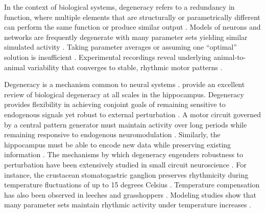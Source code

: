 \documentclass[a4paper,10pt]{article} %
\begin{document}
In the context of biological systems, degeneracy refers to a redundancy in function,
where multiple elements that are structurally or parametrically different can perform the same function
or produce similar output \parencite{edelmanDegeneracyComplexityBiological2001a, tononiMeasuresDegeneracyRedundancy1999}.
Models of neurons and networks are frequently degenerate with many parameter sets yielding similar simulated activity
\parencite{prinzAlternativeHandtuningConductancebased2003, prinzSimilarNetworkActivity2004, achardComplexParameterLandscape2006}.
Taking parameter averages or assuming one ``optimal'' solution is insufficient
\parencite{loebOptimalIsnGood2012, golowaschFailureAveragingConstruction2002}.
Experimental recordings reveal underlying animal-to-animal variability
that converges to stable, rhythmic motor patterns
\parencite{bucherAnimaltoanimalVariabilityMotor2005, hamoodAnimaltoanimalVariabilityNeuromodulation2014,
roffmanAnimaltoanimalVariabilityConnection2012, marderVariabilityCompensationModulation2011}.

Degeneracy is a mechanism common to neural systems
\parencite{whitacreDegeneracyDesignPrinciple2010, stellingRobustnessCellularFunctions2004,
goldmanGlobalStructureRobustness2001, tononiMeasuresDegeneracyRedundancy1999}.
\cite{rathourDegeneracyHippocampalPhysiology2019} provide an excellent review
of biological degeneracy at all scales in the hippocampus.
Degeneracy provides flexibility in achieving conjoint goals of remaining sensitive
to endogenous signals yet robust to external perturbation
\parencite{marderNeuromodulationCircuitsVariable2014, olearyCorrelationsIonChannel2013}.
A motor circuit governed by a central pattern generator must maintain activity
over long periods while remaining responsive to endogenous neuromodulation
\parencite{marderHowCanMotor2015}.
Similarly, the hippocampus must be able to encode new data while preserving existing information
\parencite{mauSameHippocampalCA12018, piatkevichPopulationImagingNeural2019}.
The mechanisms by which degeneracy engenders robustness to perturbation
have been extensively studied in small circuit neuroscience
\parencite{marderRobustCircuitRhythms2015, marderHowCanMotor2015, marderVariabilityCompensationModulation2011}.
For instance, the crustacean stomatogastric ganglion preserves rhythmicity
during temperature fluctuations of up to 15 degrees Celsius
\parencite{tangRobustnessRhythmicCircuit2012, rinbergEffectsTemperatureStability2013,
soofiPhaseMaintenanceRhythmic2014, marderRobustCircuitRhythms2015,
haddadCircuitRobustnessTemperature2017, tangPreciseTemperatureCompensation2010}.
Temperature compensation has also been observed in leeches
\parencite{arbasRateModificationHeartbeat1984}
and grasshoppers \parencite{roemschiedCellintrinsicMechanismsTemperature2014}.
Modeling studies show that many parameter sets maintain rhythmic activity under temperature increases
\parencite{caplanManyParameterSets2014, alonsoVisualizationCurrentsNeural2019}.
\end{document}
